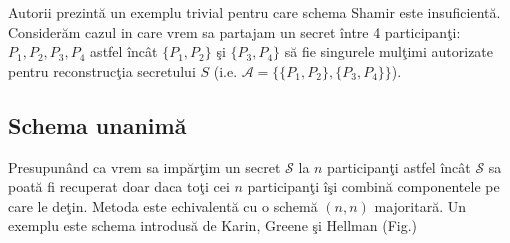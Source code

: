 \documentclass{llncs}
\begin{document}
Autorii prezint\u{a} un exemplu trivial pentru care schema Shamir este insuficient\u{a}. Consider\u{a}m cazul in care vrem sa partajam un secret \^{i}ntre 4 participan\c{t}i: $P_1, P_2, P_3, P_4$ astfel \^{i}nc\^{a}t $\{P_1,P_2\}$ \c{s}i $\{P_3,P_4\}$ s\u{a} fie singurele mul\c{t}imi autorizate pentru reconstruc\c{t}ia secretului $S$ (i.e. $\mathcal{A} = \{ \{P_1,P_2\}, \{P_3,P_4\} \}$).

\subsection{Schema unanim\u{a}}

Presupun\^{a}nd ca vrem sa imp\u{a}r\c{t}im un secret $\mathcal{S}$ la $n$ participan\c{t}i astfel \^{i}nc\^{a}t $\mathcal{S}$ sa poat\u{a} fi recuperat doar daca to\c{t}i cei $n$ participan\c{t}i \^{i}\c{s}i combin\u{a} componentele pe care le de\c{t}in. Metoda este echivalent\u{a} cu o schem\u{a} $(n, n)$ majoritar\u{a}. Un exemplu este schema introdus\u{a} de Karin, Greene \c{s}i Hellman \cite{Karnin:83} (Fig.\label{fig:all_or_nothing})
\end{document}
